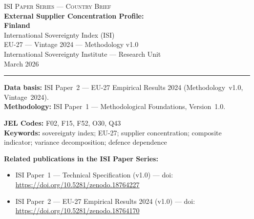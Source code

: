 \documentclass[12pt,a4paper]{article}
\begin{document}
\hypersetup{pageanchor=false}

\begin{titlepage}
\centering
\vspace*{2cm}
{\Large\textsc{ISI Paper Series --- Country Brief}}\\[1.2cm]
{\LARGE\bfseries External Supplier Concentration Profile:\\[0.3em]
Finland}\\[1.5cm]
{\large International Sovereignty Index (ISI)\\[0.3em]
EU-27 --- Vintage 2024 --- Methodology v1.0}\\[1.2cm]
{\large International Sovereignty Institute --- Research Unit}\\[0.8cm]
{\large March 2026}

\vspace{0.8cm}
\noindent\rule{\textwidth}{0.4pt}
\vspace{0.4cm}

\begin{flushleft}
\noindent\textbf{Data basis:} ISI Paper~2 --- EU-27 Empirical Results 2024 (Methodology~v1.0, Vintage~2024).\\[4pt]
\noindent\textbf{Methodology:} ISI Paper~1 --- Methodological Foundations, Version~1.0.

\medskip

\noindent\textbf{JEL Codes:} F02, F15, F52, O30, Q43\\[4pt]
\noindent\textbf{Keywords:} sovereignty index; EU-27; supplier concentration; composite indicator; variance decomposition; defence dependence

\medskip

\noindent\textbf{Related publications in the ISI Paper Series:}
\begin{itemize}[nosep,leftmargin=1.5em]
\item ISI Paper~1 --- Technical Specification (v1.0) --- doi:\\
  \url{https://doi.org/10.5281/zenodo.18764227}
\item ISI Paper~2 --- EU-27 Empirical Results 2024 (v1.0) --- doi:\\
  \url{https://doi.org/10.5281/zenodo.18764170}
\end{itemize}
\end{flushleft}
\vfill
\end{titlepage}
\end{document}
